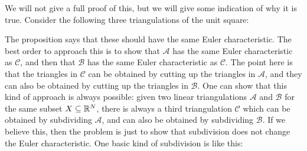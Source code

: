 \documentclass[reqno]{amsart}
\theoremstyle{definition}
\begin{document}
We will not give a full proof of this, but we will give some
indication of why it is true.  Consider the following three
triangulations of the unit square:
\begin{center}
\end{center}
The proposition says that these should have the same Euler
characteristic.  The best order to approach this is to show that
$\mathcal{A}$ has the same Euler characteristic as $\mathcal{C}$, and
then that $\mathcal{B}$ has the same Euler characteristic as
$\mathcal{C}$.  The point here is that the triangles in $\mathcal{C}$
can be obtained by cutting up the triangles in $\mathcal{A}$, and they
can also be obtained by cutting up the triangles in $\mathcal{B}$.
One can show that this kind of approach is always possible: given two
linear triangulations $\mathcal{A}$ and $\mathcal{B}$ for the same
subset $X\subseteq\mathbb{R}^N$, there is always a third triangulation
$\mathcal{C}$ which can be obtained by subdividing $\mathcal{A}$, and
can also be obtained by subdividing $\mathcal{B}$.  If we believe
this, then the problem is just to show that subdivision does not
change the Euler characteristic.  One basic kind of subdivision is
like this:  
\end{document}
